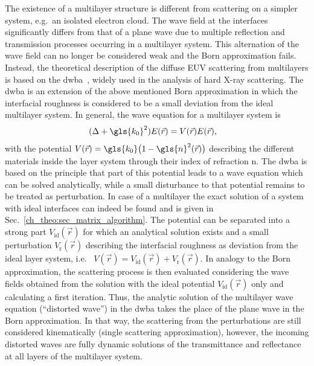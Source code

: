 The existence of a multilayer structure is different from scattering on a simpler system, e.g.~an isolated electron cloud. The wave field at the interfaces significantly differs from that of a plane wave due to multiple reflection and transmission processes occurring in a multilayer system. This alternation of the wave field can no longer be considered weak and the Born approximation fails. Instead, the theoretical description of the diffuse EUV scattering from multilayers is based on the \gls{dwba}~\cite{holy_nonspecular_1994,holy_x-ray_1993}, widely used in the analysis of hard X-ray scattering. The \gls{dwba} is an extension of the above mentioned Born approximation in which the interfacial roughness is considered to be a small deviation from the ideal multilayer system. In general, the wave equation for a multilayer system is
\begin{align}
        (\Delta + \gls{k_0}^2) E(\vec{r}) &= V(\vec{r}) E(\vec{r})\text{,} \label{ch_theo:eqn_multilayer_wave_equation} 
\end{align}
with the potential $V(\vec{r}) = \gls{k_0}\big(1-\gls{n}^2(\vec{r})\big)$ \cite{pietsch_high-resolution_2004} describing the different materials inside the layer system through their index of refraction \gls{n}. The \gls{dwba} is based on the principle that part of this potential leads to a wave equation which can be solved analytically, while a small disturbance to that potential remains to be treated as perturbation. In case of a multilayer the exact solution of a system with ideal interfaces can indeed be found and is given in Sec.~\ref{ch_theo:sec_matrix_algorithm}. The potential can be separated into a strong part $V_\text{id}(\vec{r})$ for which an analytical solution exists and a small perturbation $V_\text{r}(\vec{r})$ describing the interfacial roughness as deviation from the ideal layer system, i.e.~  $V(\vec{r}) = V_\text{id}(\vec{r}) + V_\text{r}(\vec{r})$. In analogy to the Born approximation, the scattering process is then evaluated considering the wave fields obtained from the solution with the ideal potential $V_\text{id}(\vec{r})$ only and calculating a first iteration. Thus, the analytic solution of the multilayer wave equation (``distorted wave'') in the \gls{dwba} takes the place of the plane wave in the Born approximation. In that way, the scattering from the perturbations are still considered kinematically (single scattering approximation), however, the incoming distorted waves are fully dynamic solutions of the transmittance and reflectance at all layers of the multilayer system.



